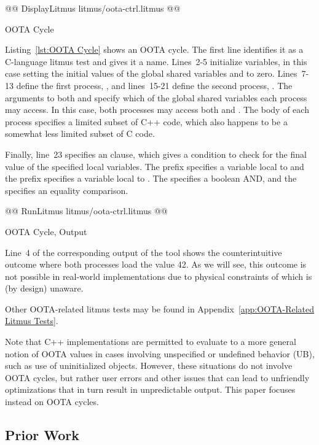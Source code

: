 \documentclass[10]{article}
\begin{document}
\begin{listing}[tbp]
@@ DisplayLitmus litmus/oota-ctrl.litmus @@
\caption{OOTA Cycle}
\label{lst:OOTA Cycle}
\end{listing}

Listing~\ref{lst:OOTA Cycle}
shows an OOTA cycle.
The first line identifies it as a C-language litmus test and gives it
a name.
Lines~2-5 initialize variables, in this case setting the initial
values of the global shared variables  and  to zero.
Lines~7-13 define the first process, , and lines~15-21
define the second process, .
The arguments to both  and  specify which of
the global shared variables each process may access.
In this case, both processes may access both  and .
The body of each process specifies a limited subset of C++ code,
which also happens to be a somewhat less limited subset of C code.

Finally, line~23 specifies an  clause, which gives a
condition to check for the final value of the specified local
variables.
The  prefix specifies a variable local to  and
the  prefix specifies a variable local to .
The \co{/\\} specifies a boolean AND, and the \co{=} specifies
an equality comparison.

\begin{listing}[tbp]
@@ RunLitmus litmus/oota-ctrl.litmus @@
\caption{OOTA Cycle,  Output}
\label{lst:OOTA Cycle, herd7 Output}
\end{listing}

Line~4 of the corresponding output of the  tool shows the
counterintuitive outcome where both processes load the value 42.
As we will see, this outcome is not possible in real-world implementations
due to physical constraints of which  is (by design) unaware.

Other OOTA-related litmus tests may be found in
Appendix~\ref{app:OOTA-Related Litmus Tests}.

Note that C++ implementations are permitted to evaluate to a more
general notion of OOTA values in cases involving unspecified or undefined
behavior (UB), such as use of uninitialized objects.
However, these situations do not involve OOTA cycles, but rather user
errors and other issues that can lead to unfriendly optimizations that
in turn result in unpredictable output.
This paper focuses instead on OOTA cycles.

\subsection{Prior Work}
\label{sec:Prior Work}
\end{document}
